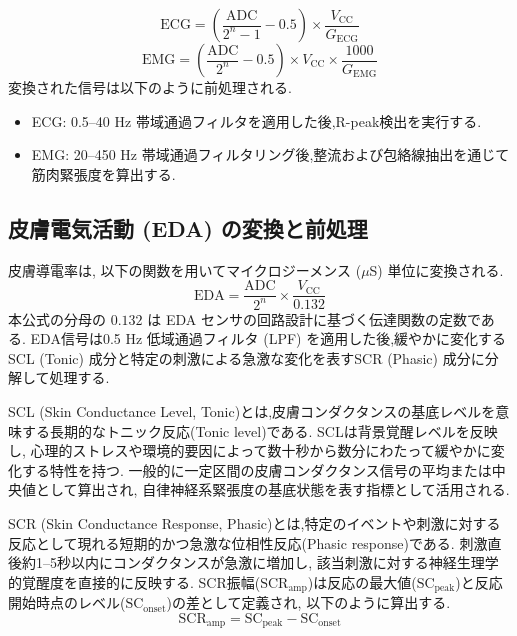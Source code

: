 \documentclass[book,paper=a4,fontsize=10pt,jafontscale=0.92]{jlreq}
\begin{document}
$$\mathrm{ECG} = \left( \frac{\mathrm{ADC}}{2^n - 1} - 0.5 \right) \times \frac{V_{\mathrm{CC}}}{G_\mathrm{ECG}}$$
$$\mathrm{EMG} = \left( \frac{\mathrm{ADC}}{2^n} - 0.5 \right) \times V_{\mathrm{CC}} \times \frac{1000}{G_\mathrm{EMG}}$$
変換された信号は以下のように前処理される.
\begin{itemize}
\item ECG: 0.5--40 Hz 帯域通過フィルタを適用した後,R-peak検出を実行する.
\item EMG: 20--450 Hz 帯域通過フィルタリング後,整流および包絡線抽出を通じて筋肉緊張度を算出する.
\end{itemize}

\subsection{皮膚電気活動 (EDA) の変換と前処理}
皮膚導電率は, 以下の関数を用いてマイクロジーメンス ($\mu$S) 単位に変換される.
$$\mathrm{EDA} = \frac{\mathrm{ADC}}{2^n} \times \frac{V_{\mathrm{CC}}}{0.132}$$
本公式の分母の $0.132$ は EDA センサの回路設計に基づく伝達関数の定数である.
EDA信号は0.5 Hz 低域通過フィルタ (LPF) を適用した後,緩やかに変化するSCL (Tonic) 成分と特定の刺激による急激な変化を表すSCR (Phasic) 成分に分解して処理する.

SCL (Skin Conductance Level, Tonic)とは,皮膚コンダクタンスの基底レベルを意味する長期的なトニック反応(Tonic level)である. SCLは背景覚醒レベルを反映し, 心理的ストレスや環境的要因によって数十秒から数分にわたって緩やかに変化する特性を持つ. 一般的に一定区間の皮膚コンダクタンス信号の平均または中央値として算出され, 自律神経系緊張度の基底状態を表す指標として活用される.

SCR (Skin Conductance Response, Phasic)とは,特定のイベントや刺激に対する反応として現れる短期的かつ急激な位相性反応(Phasic response)である. 刺激直後約1--5秒以内にコンダクタンスが急激に増加し, 該当刺激に対する神経生理学的覚醒度を直接的に反映する. 
SCR振幅($\mathrm{SCR_{amp}}$)は反応の最大値($\mathrm{SC_{peak}}$)と反応開始時点のレベル($\mathrm{SC_{onset}}$)の差として定義され, 以下のように算出する.
$$\mathrm{SCR_{amp}} = \mathrm{SC_{peak}} - \mathrm{SC_{onset}}$$



\end{document}
